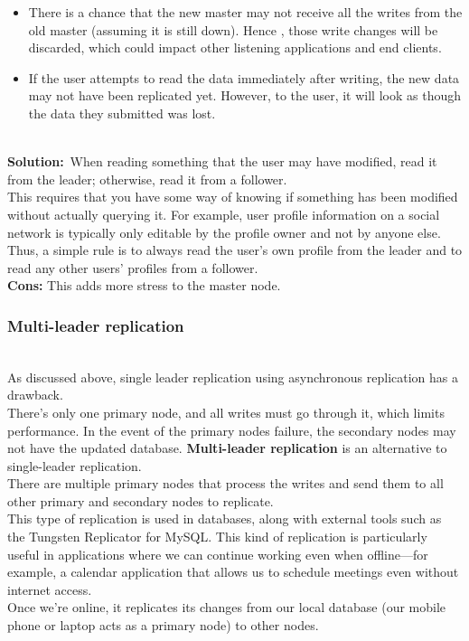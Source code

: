 \begin{itemize}
\item
\protect{}\label{OnzEaeDyIxUd8Q-y-o4c2}
There is a chance that the new master may not receive all the writes from the old master (assuming it is still down). Hence , those write changes will be discarded, which could impact other listening applications and end clients.
\item
\protect{}\label{47stiyuqfUA246HimRuKt}
If the user attempts to read the data immediately after writing, the new data may not have been replicated yet. However, to the user, it will look as though the data they submitted was lost.
\end{itemize}
\\
\textbf{Solution:}~When reading something that the user may have modified, read it from the leader; otherwise, read it from a follower.
\\
This requires that you have some way of knowing if something has been modified without actually querying it. For example, user profile information on a social network is typically only editable by the profile owner and not by anyone else.
\\
Thus, a simple rule is to always read the user's own profile from the leader and to read any other users' profiles from a follower.
\\
\textbf{Cons:} This adds more stress to the master node.

\subsubsection{Multi-leader replication}\label{CRrrmoZeP4X019dd6DanY}
\\
As discussed above, single leader replication using asynchronous replication has a drawback.
\\
There's only one primary node, and all writes must go through it, which limits performance. In the event of the primary node\textquotesingle s failure, the secondary nodes may not have the updated database. \textbf{Multi-leader replication} is an alternative to single-leader replication.
\\
There are multiple primary nodes that process the writes and send them to all other primary and secondary nodes to replicate.
\\
This type of replication is used in databases, along with external tools such as the Tungsten Replicator for MySQL. This kind of replication is particularly useful in applications where we can continue working even when offline---for example, a calendar application that allows us to schedule meetings even without internet access.
\\
Once we're online, it replicates its changes from our local database (our mobile phone or laptop acts as a primary node) to other nodes.

